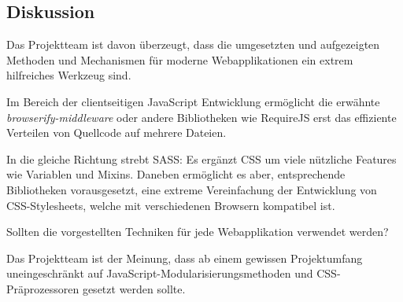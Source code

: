 \subsection*{Diskussion}
Das Projektteam ist davon überzeugt, dass die umgesetzten und aufgezeigten Methoden und Mechanismen für moderne Webapplikationen ein extrem hilfreiches Werkzeug sind.

Im Bereich der clientseitigen JavaScript Entwicklung ermöglicht die erwähnte \emph{browserify-middleware} oder andere Bibliotheken wie RequireJS \cite{requirejs} erst das effiziente Verteilen von Quellcode auf mehrere Dateien.

In die gleiche Richtung strebt SASS: Es ergänzt CSS um viele nützliche Features wie Variablen und Mixins. Daneben ermöglicht es aber, entsprechende Bibliotheken vorausgesetzt, eine extreme Vereinfachung der Entwicklung von CSS-Stylesheets, welche mit verschiedenen Browsern kompatibel ist.

Sollten die vorgestellten Techniken für jede Webapplikation verwendet werden?

Das Projektteam ist der Meinung, dass ab einem gewissen Projektumfang uneingeschränkt auf JavaScript-Modularisierungsmethoden und CSS-Präprozessoren gesetzt werden sollte.
